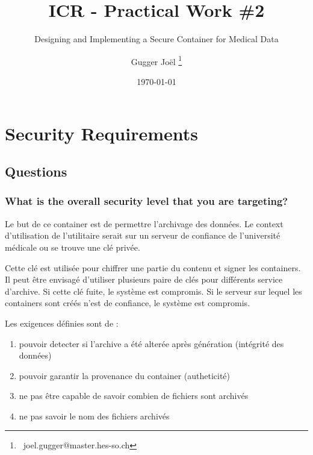 \documentclass[a4paper]{report}
\title{ICR - Practical Work \#2}
\subtitle{Designing and Implementing a Secure Container for Medical Data}
\author{Gugger Joël \thanks{\ joel.gugger@master.hes-so.ch}}
\date{\today}
\begin{document}
 
\maketitle



\tableofcontents

 
\chapter{Security Requirements}
\section{Questions}
\subsection{What is the overall security level that you are targeting?}
Le but de ce container est de permettre l'archivage des données. Le context d'utilisation de l'utilitaire serait sur un serveur de confiance de l'université médicale ou se trouve une clé privée.

Cette clé est utilisée pour chiffrer une partie du contenu et signer les containers. Il peut être envisagé d'utiliser plusieurs paire de clés pour différents service d'archive. Si cette clé fuite, le système est compromis. Si le serveur sur lequel les containers sont créés n'est de confiance, le système est compromis.

Les exigences définies sont de :

\begin{enumerate}
    \item{pouvoir detecter si l'archive a été alterée après génération (intégrité des données)}
    \item{pouvoir garantir la provenance du container (autheticité)}
    \item{ne pas être capable de savoir combien de fichiers sont archivés}
    \item{ne pas savoir le nom des fichiers archivés}
\end{enumerate}
\end{document}
